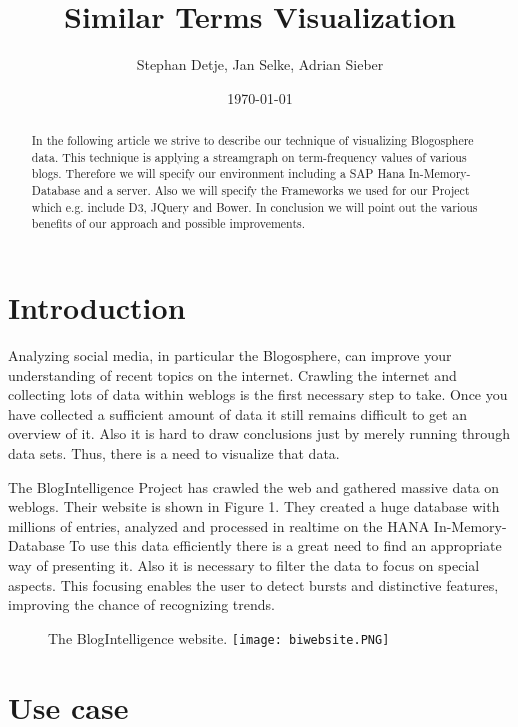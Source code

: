 \documentclass{llncs}
\title{Similar Terms Visualization}
\author{Stephan Detje, Jan Selke, Adrian Sieber}
\institute{Hasso-Plattner-Institute Potsdam}
\date{\today}
\begin{document}
\maketitle

\begin{abstract}
In the following article we strive to describe our technique of visualizing Blogosphere data. This technique is applying a streamgraph on term-frequency values of various blogs. Therefore we will specify our environment including a SAP Hana In-Memory-Database and a server. Also we will specify the Frameworks we used for our Project which e.g. include D3, JQuery and Bower. In conclusion we will point out the various benefits of our approach and possible improvements.
\end{abstract}

\section{Introduction}

Analyzing social media, in particular the Blogosphere, can improve your understanding of recent topics on the internet. Crawling the internet and collecting lots of data within weblogs is the first necessary step to take. Once you have collected a sufficient amount of data it still remains difficult to get an overview of it. Also it is hard to draw conclusions just by merely running through data sets. Thus, there is a need to visualize that data.



The BlogIntelligence Project has crawled the web and gathered massive data on weblogs. Their website is shown in Figure 1. They created a huge database with millions of entries, analyzed and processed in realtime on the HANA In-Memory-Database To use this data efficiently there is a great need to find an appropriate way of presenting it. Also it is necessary to filter the data to focus on special aspects. This focusing enables the user to detect bursts and distinctive features, improving the chance of recognizing trends.

\begin{figure}[h!]
\caption{\label{fig:biwebsite}}The BlogIntelligence website.
  \centering
  \texttt{[image: biwebsite.PNG]}
\end{figure}

\section{Use case}
\label{sec:examples}
\end{document}
